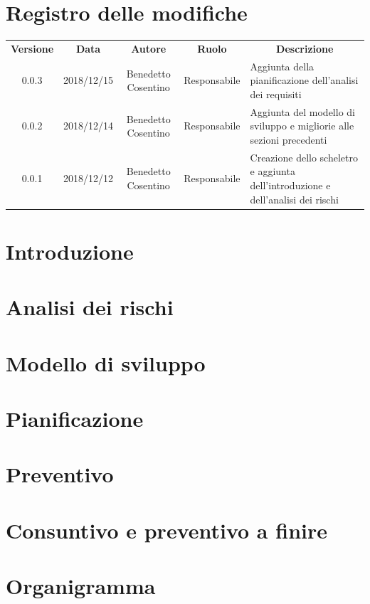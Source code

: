 \documentclass[11pt,a4paper]{article}
\begin{document}
	

	\tableofcontents
	\newpage
	\section*{\centering Registro delle modifiche}
	\begin{tabularx}{\textwidth}{ c | c | c | c | X }
		\rowcolor{LightBlue}
		\color{white}\bfseries Versione & \color{white}\bfseries Data & \color{white}\bfseries Autore & \color{white}\bfseries Ruolo & \multicolumn{1}{c}{\color{white}\bfseries Descrizione}\\[0.25cm]
		0.0.3 & 2018/12/15 & Benedetto Cosentino & Responsabile & Aggiunta della pianificazione dell'analisi dei requisiti\\
		0.0.2 & 2018/12/14 & Benedetto Cosentino & Responsabile & Aggiunta del modello di sviluppo e migliorie alle sezioni precedenti\\
		0.0.1 & 2018/12/12 & Benedetto Cosentino & Responsabile & Creazione dello scheletro e aggiunta dell'introduzione e dell'analisi dei rischi\\
	\end{tabularx}

	\newpage	
	\section{Introduzione}
			
		\newpage	
	
	\section{Analisi dei rischi}
		
		\newpage	

	\section{Modello di sviluppo}
		
		\newpage	

	\section{Pianificazione}
		
		
	\section{Preventivo}
%		
		
	\section{Consuntivo e preventivo a finire}
%		

	\appendix
	\section{Organigramma}
%		
\end{document}

